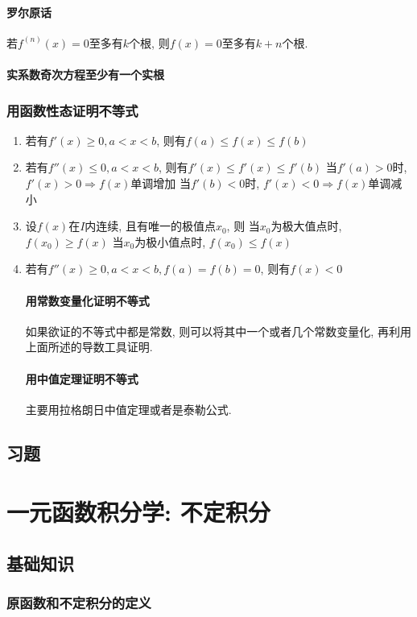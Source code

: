 \subsubsection{罗尔原话}
若$ f^{(n)}(x)=0 $至多有$ k $个根, 则$ f(x)=0 $至多有$ k+n $个根.
\subsubsection{实系数奇次方程至少有一个实根}
\subsection{用函数性态证明不等式}
\begin{enumerate}
    \item 若有$ f'(x)\ge 0, a<x<b $, 则有$ f(a)\le f(x)\le f(b) $
    \item 若有$ f''(x)\le 0, a<x<b $, 则有$ f'(x)\le f'(x)\le f'(b) $
          \subitem 当$ f'(a)>0 $时, $ f'(x)>0\Rightarrow f(x) $单调增加
          \subitem 当$ f'(b)<0 $时, $ f'(x)<0\Rightarrow f(x) $单调减小
    \item 设$ f(x) $在$ I $内连续, 且有唯一的极值点$ x_{0} $, 则
          \subitem 当$ x_{0} $为极大值点时, $ f(x_{0})\ge f(x) $
          \subitem 当$ x_{0} $为极小值点时, $ f(x_{0})\le f(x) $
    \item 若有$ f''(x)\ge 0, a<x<b, f(a)=f(b)=0 $, 则有$ f(x)<0 $
          \subsubsection{用常数变量化证明不等式}
          如果欲证的不等式中都是常数, 则可以将其中一个或者几个常数变量化, 再利用上面所述的导数工具证明.
          \subsubsection{用中值定理证明不等式}
          主要用拉格朗日中值定理或者是泰勒公式.
\end{enumerate}
\section{习题}
\chapter{一元函数积分学: 不定积分}
\section{基础知识}
\subsection{原函数和不定积分的定义}
